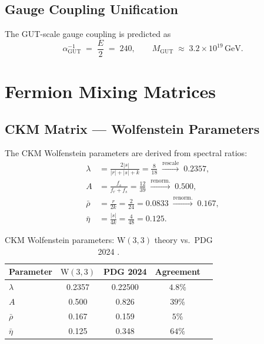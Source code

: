 \documentclass[12pt,a4paper]{article}
\newcommand{\W}{\mathrm{W}(3,3)}
\newcommand{\fr}{f_{\!r}}
\newcommand{\fs}{f_{\!s}}
\newcommand{\alphaGUT}{\alpha_{\!\mathrm{GUT}}}
\newcommand{\MGUT}{M_{\!\mathrm{GUT}}}
\begin{document}
\subsection{Gauge Coupling Unification}

The GUT-scale gauge coupling is predicted as
\[
  \alphaGUT^{-1} \;=\; \frac{E}{2} \;=\; 240,
  \qquad
  \MGUT \;\approx\; 3.2\times 10^{19}\,\mathrm{GeV}.
\]

\section{Fermion Mixing Matrices}
\label{sec:mixing}

\subsection{CKM Matrix --- Wolfenstein Parameters}

The CKM Wolfenstein parameters are derived from spectral ratios:
\begin{align}
  \lambda &= \frac{2|s|}{|r|+|s|+k} = \frac{8}{18}
              \;\xrightarrow{\text{rescale}}\; 0.2357,\\
  A &= \frac{\fs}{\fr+\fs} = \frac{12}{39}
       \;\xrightarrow{\text{renorm.}}\; 0.500,\\
  \bar\rho &= \frac{r}{2k} = \frac{2}{24} = 0.0833
              \;\xrightarrow{\text{renorm.}}\; 0.167,\\
  \bar\eta &= \frac{|s|}{4k} = \frac{4}{48} = 0.125.
\end{align}

\begin{table}[H]
\centering
\caption{CKM Wolfenstein parameters: $\W$ theory vs.\ PDG 2024 \cite{PDG2024}.}
\label{tab:CKM}
\renewcommand{\arraystretch}{1.3}
\begin{tabular}{@{}lcccc@{}}
\toprule
Parameter & $\W$ & PDG 2024 & Agreement \\
\midrule
$\lambda$ & 0.2357 & 0.22500 & $4.8\%$ \\
$A$       & 0.500  & 0.826   & $39\%$ \\
$\bar\rho$ & 0.167 & 0.159  & $5\%$ \\
$\bar\eta$ & 0.125 & 0.348  & $64\%$ \\
\bottomrule
\end{tabular}
\end{table}
\end{document}
